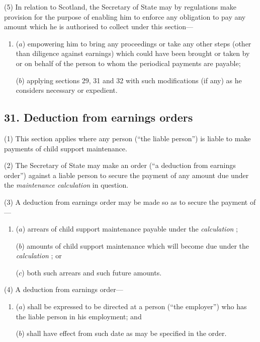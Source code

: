 \documentclass[12pt,a4paper]{article}
\begin{document}
(5) In relation to Scotland, the Secretary of State may by regulations make provision for the purpose of enabling him to enforce any obligation to pay any amount which he is authorised to collect under this section—
\begin{enumerate}\item[]
($a$) empowering him to bring any proceedings or take any other steps (other than diligence against earnings) which could have been brought or taken by or on behalf of the person to whom the periodical payments are payable;

($b$) applying sections 29, 31 and 32 with such modifications (if any) as he considers necessary or expedient.
\end{enumerate}


\subsection{31. Deduction from earnings orders}

(1) This section applies where any person (“the liable person”) is liable to make payments of child support maintenance.

(2) The Secretary of State may make an order (“a deduction from earnings order”) against a liable person to secure the payment of any amount due under the 
\emph{maintenance calculation}  %
in question.

(3) A deduction from earnings order may be made so as to secure the payment of—
\begin{enumerate}\item[]
($a$) arrears of child support maintenance payable under the 
\emph{calculation}%
;

($b$) amounts of child support maintenance which will become due under the 
\emph{calculation}%
; or

($c$) both such arrears and such future amounts.
\end{enumerate}

(4) A deduction from earnings order—
\begin{enumerate}\item[]
($a$) shall be expressed to be directed at a person (“the employer”) who has the liable person in his employment; and

($b$) shall have effect from such date as may be specified in the order.
\end{enumerate}
\end{document}
